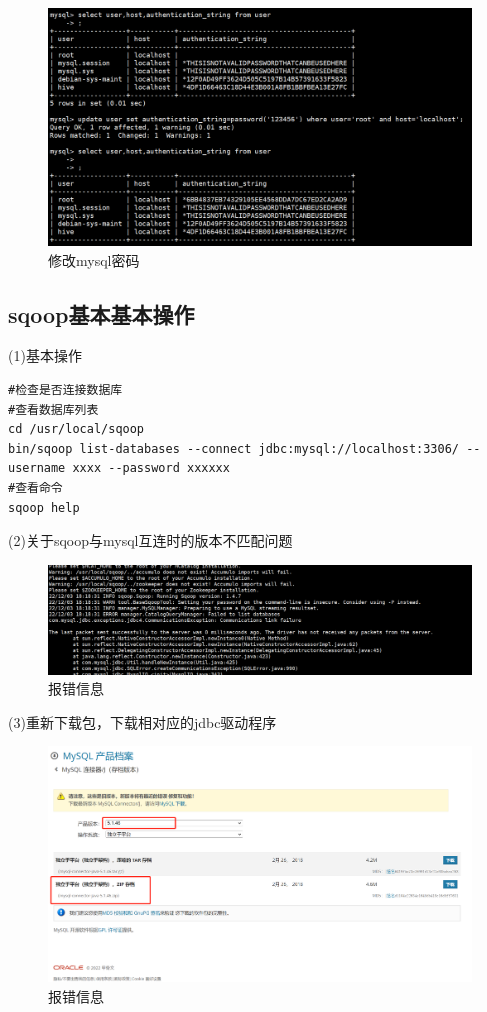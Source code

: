 \documentclass[12pt]{article}
\begin{document}
\begin{figure}[ht]
\centering
\includegraphics[scale=0.7]{figures/111.png}
\caption{修改mysql密码}\label{fig:label2}
\end{figure}


\newpage
\subsection{sqoop基本基本操作}
(1)基本操作
\begin{lstlisting}
#检查是否连接数据库
#查看数据库列表
cd /usr/local/sqoop
bin/sqoop list-databases --connect jdbc:mysql://localhost:3306/ --username xxxx --password xxxxxx
#查看命令
sqoop help
\end{lstlisting}

(2)关于sqoop与mysql互连时的版本不匹配问题

\begin{figure}[ht]
\centering
\includegraphics[scale=0.6]{figures/222.png}
\caption{报错信息}\label{fig:label2}
\end{figure}

\newpage
(3)重新下载包，下载相对应的jdbc驱动程序

\begin{figure}[ht]
\centering
\includegraphics[scale=0.4]{figures/555.png}
\caption{报错信息}\label{fig:label2}
\end{figure}
\end{document}
